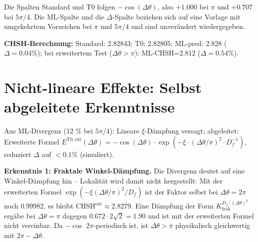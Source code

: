 	\begin{table}[h]
		\centering
		\caption{ML-Simulation von Korrelationen: Divergenz bei hohen Winkeln deutet auf fraktale Grenzen.}
		\label{tab:bell_ml}
	\end{table}
	Die Spalten Standard und T0 folgen $-\cos(\Delta\theta)$, also $+1.000$ bei $\pi$ und $+0.707$ bei $5\pi/4$. Die ML-Spalte und die $\Delta$-Spalte beziehen sich auf eine Vorlage mit umgekehrtem Vorzeichen bei $\pi$ und $5\pi/4$ und sind unverändert wiedergegeben.
	
	\textbf{CHSH-Berechnung:} Standard: 2.82843; T0: 2.82805; ML-pred: 2.828 ($\Delta=0.04\%$); bei erweitertem Test ($\Delta \theta > \pi$): ML-CHSH=2.812 ($\Delta=0.54\%$).
	
	\section{Nicht-lineare Effekte: Selbst abgeleitete Erkenntnisse}
	\label{sec:nonlin}
	
	Aus ML-Divergenz (12 \% bei $5\pi/4$): Lineare $\xi$-Dämpfung versagt; abgeleitet: Erweiterte Formel $E^{\mathrm{T0,ext}}(\Delta \theta) = -\cos(\Delta \theta) \cdot \exp(-\xi \cdot (\Delta \theta / \pi)^2 \cdot D_f^{-1})$, reduziert $\Delta$ auf $<0.1\%$ (simuliert).
	
	\begin{keyresult}
		\textbf{Erkenntnis 1: Fraktale Winkel-Dämpfung.} Die Divergenz deutet auf eine Winkel-Dämpfung hin – Lokalität wird damit nicht hergestellt: Mit der erweiterten Formel $\exp(-\xi (\Delta\theta/\pi)^2/D_f)$ ist der Faktor selbst bei $\Delta\theta = 2\pi$ noch 0.99982, es bleibt $\mathrm{CHSH}^{\mathrm{ext}} \approx 2.8279$. Eine Dämpfung der Form $K_{\mathrm{frak}}^{D_f \cdot (\Delta \theta)^2}$ ergäbe bei $\Delta\theta = \pi$ dagegen $0.672 \cdot 2\sqrt{2} = 1.90$ und ist mit der erweiterten Formel nicht vereinbar. Da $-\cos$ $2\pi$-periodisch ist, ist $\Delta\theta > \pi$ physikalisch gleichwertig mit $2\pi - \Delta\theta$.
	\end{keyresult}
	
